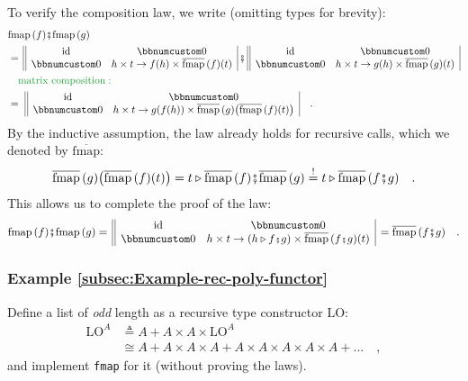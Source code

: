 To verify the composition law, we write (omitting types for brevity):
\begin{align*}
 & \text{fmap}\,(f)\bef\text{fmap}\,(g)\\
 & =\,\begin{array}{||cc|}
\text{id} & \bbnum 0\\
\bbnum 0 & h\times t\rightarrow f(h)\times\overline{\text{fmap}}\,(f)(t)
\end{array}\,\bef\,\begin{array}{||cc|}
\text{id} & \bbnum 0\\
\bbnum 0 & h\times t\rightarrow g(h)\times\overline{\text{fmap}}\,(g)(t)
\end{array}\\
 & \quad{\color{greenunder}\text{matrix composition}:}\quad\\
 & =\,\,\begin{array}{||cc|}
\text{id} & \bbnum 0\\
\bbnum 0 & h\times t\rightarrow g(f(h))\times\overline{\text{fmap}}\,(g)\big(\overline{\text{fmap}}\,(f)(t)\big)
\end{array}\quad.
\end{align*}
By the inductive assumption, the law already holds for recursive calls,
which we denoted by $\overline{\text{fmap}}$:
\[
\overline{\text{fmap}}\,(g)\big(\overline{\text{fmap}}\,(f)(t)\big)=t\triangleright\overline{\text{fmap}}\,(f)\bef\overline{\text{fmap}}\,(g)\overset{!}{=}t\triangleright\overline{\text{fmap}}\,(f\bef g)\quad.
\]
This allows us to complete the proof of the law:
\[
\text{fmap}\,(f)\bef\text{fmap}\,(g)=\,\begin{array}{||cc|}
\text{id} & \bbnum 0\\
\bbnum 0 & h\times t\rightarrow(h\triangleright f\bef g)\times\overline{\text{fmap}}\,(f\bef g)(t)
\end{array}\,=\overline{\text{fmap}}\,(f\bef g)\quad.
\]


\subsubsection{Example \label{subsec:Example-rec-poly-functor}\ref{subsec:Example-rec-poly-functor}}

Define a list of \emph{odd} length as a recursive type constructor
$\text{LO}$:
\begin{align}
\text{LO}^{A} & \triangleq A+A\times A\times\text{LO}^{A}\label{eq:f-lo-def}\\
 & \cong A+A\times A\times A+A\times A\times A\times A\times A+...\quad,\nonumber 
\end{align}
and implement \lstinline!fmap! for it (without proving the laws).

